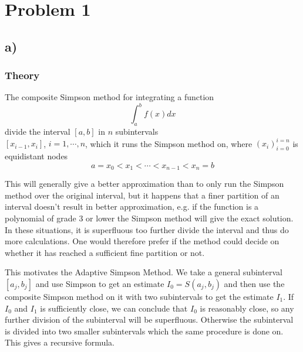 \documentclass[12pt, a4paper,usenames,dvipsnames]{article}
\begin{document}
\section*{Problem 1}
\subsection*{a)}
\subsubsection*{Theory}
The composite Simpson method for integrating a function 
\[\int_a^bf(x)dx\] 
divide the interval \([a,b]\) in \(n\) subintervals\\ \([x_{i-1},x_i]\), \(i=1,\cdots,n\), which it runs the Simpson method on, where \((x_i)_{i=0}^{i=n}\) is equidistant nodes \[a=x_0<x_1<\cdots<x_{n-1}<x_n=b\]

This will generally give a better approximation than to only run the Simpson method over the original interval, but it happens that a finer partition of an interval doesn't result in better approximation, e.g. if the function is a polynomial of grade 3 or lower the Simpson method will give the exact solution. In these situations, it is superfluous too further divide the interval and thus do more calculations. One would therefore prefer if the method could decide on whether it has reached a sufficient fine partition or not.

This motivates the Adaptive Simpson Method. We take a general subinterval \([a_j,b_j]\) and use Simpson to get an estimate \(I_0=S(a_j,b_j)\) and then use the composite Simpson method on it with two subintervals to get the estimate \(I_1\). If \(I_0\) and \(I_1\) is sufficiently close, we can conclude that \(I_0\) is reasonably close, so any further division of the subinterval will be superfluous. Otherwise the subinterval is divided into two smaller subintervals which the same procedure is done on. This gives a recursive formula. 
\end{document}
